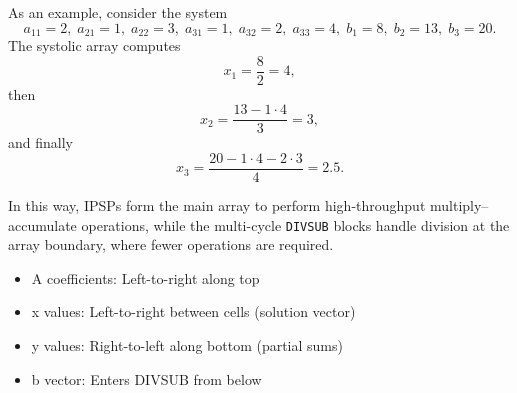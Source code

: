 \documentclass[a4paper,12pt]{article}
\begin{document}
As an example, consider the system
\[
a_{11}=2,\; a_{21}=1,\; a_{22}=3,\; a_{31}=1,\; a_{32}=2,\; a_{33}=4,\;
b_1=8,\; b_2=13,\; b_3=20.
\]
The systolic array computes
\[
x_1 = \frac{8}{2} = 4,
\]
then
\[
x_2 = \frac{13 - 1\cdot 4}{3} = 3,
\]
and finally
\[
x_3 = \frac{20 - 1\cdot 4 - 2\cdot 3}{4} = 2.5.
\]

In this way, IPSPs form the main array to perform high-throughput multiply--accumulate operations, while the multi-cycle \texttt{DIVSUB} blocks handle division at the array boundary, where fewer operations are required.

\begin{itemize}
    \item A coefficients: Left-to-right along top
    \item x values: Left-to-right between cells (solution vector)
    \item y values: Right-to-left along bottom (partial sums)
    \item b vector: Enters DIVSUB from below
\end{itemize}
\end{document}
